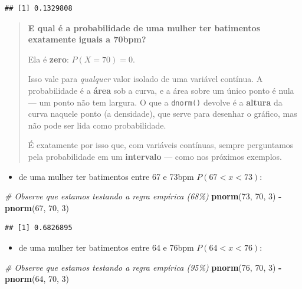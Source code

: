 \documentclass[
]{book}
\newenvironment{Shaded}{\begin{snugshade}}{\end{snugshade}}
\newcommand{\CommentTok}[1]{\textcolor[rgb]{0.56,0.35,0.01}{\textit{#1}}}
\newcommand{\DecValTok}[1]{\textcolor[rgb]{0.00,0.00,0.81}{#1}}
\newcommand{\FunctionTok}[1]{\textcolor[rgb]{0.13,0.29,0.53}{\textbf{#1}}}
\newcommand{\NormalTok}[1]{#1}
\newcommand{\SpecialCharTok}[1]{\textcolor[rgb]{0.81,0.36,0.00}{\textbf{#1}}}
\providecommand{\tightlist}{%
  \setlength{\itemsep}{0pt}\setlength{\parskip}{0pt}}
\begin{document}
\begin{verbatim}
## [1] 0.1329808
\end{verbatim}

\begin{quote}
\textbf{E qual é a probabilidade de uma mulher ter batimentos exatamente iguais a 70bpm?}

Ela é \textbf{zero}: \(P(X = 70) = 0\).

Isso vale para \emph{qualquer} valor isolado de uma variável contínua. A probabilidade é a \textbf{área} sob a curva, e a área sobre um único ponto é nula --- um ponto não tem largura. O que a \texttt{dnorm()} devolve é a \textbf{altura} da curva naquele ponto (a densidade), que serve para desenhar o gráfico, mas não pode ser lida como probabilidade.

É exatamente por isso que, com variáveis contínuas, sempre perguntamos pela probabilidade em um \textbf{intervalo} --- como nos próximos exemplos.
\end{quote}

\begin{itemize}
\tightlist
\item
  de uma mulher ter batimentos entre 67 e 73bpm \(P(67 < x < 73)\):
\end{itemize}

\begin{Shaded}
\begin{Highlighting}[]
\CommentTok{\# Observe que estamos testando a regra empírica (68\%)}
\FunctionTok{pnorm}\NormalTok{(}\DecValTok{73}\NormalTok{, }\DecValTok{70}\NormalTok{, }\DecValTok{3}\NormalTok{) }\SpecialCharTok{{-}} \FunctionTok{pnorm}\NormalTok{(}\DecValTok{67}\NormalTok{, }\DecValTok{70}\NormalTok{, }\DecValTok{3}\NormalTok{)}
\end{Highlighting}
\end{Shaded}

\begin{verbatim}
## [1] 0.6826895
\end{verbatim}

\begin{itemize}
\tightlist
\item
  de uma mulher ter batimentos entre 64 e 76bpm \(P(64 < x < 76)\):
\end{itemize}

\begin{Shaded}
\begin{Highlighting}[]
\CommentTok{\# Observe que estamos testando a regra empírica (95\%)}
\FunctionTok{pnorm}\NormalTok{(}\DecValTok{76}\NormalTok{, }\DecValTok{70}\NormalTok{, }\DecValTok{3}\NormalTok{) }\SpecialCharTok{{-}} \FunctionTok{pnorm}\NormalTok{(}\DecValTok{64}\NormalTok{, }\DecValTok{70}\NormalTok{, }\DecValTok{3}\NormalTok{)}
\end{Highlighting}
\end{Shaded}
\end{document}
